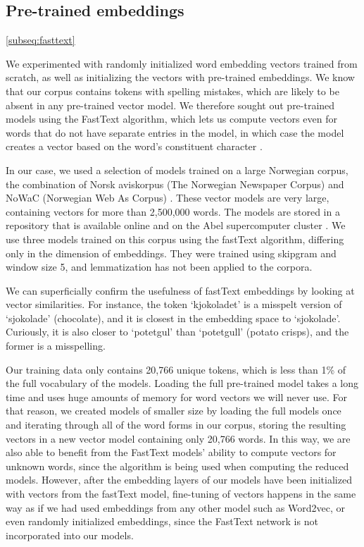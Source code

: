\subsection{Pre-trained embeddings}
\ref{subseq:fasttext}

We experimented with randomly initialized word embedding vectors trained from
scratch, as well as initializing the vectors with pre-trained embeddings. We
know that our corpus contains tokens with spelling mistakes, which are likely
to be absent in any pre-trained vector model. We therefore sought out
pre-trained models using the FastText algorithm, which lets us compute
vectors even for words that do not have separate entries in the model, in
which case the model creates a vector based on the word's constituent
character \ngrams.

In our case, we used a selection of models trained on a large Norwegian
corpus, the combination of Norsk aviskorpus (The Norwegian Newspaper Corpus)
and NoWaC (Norwegian Web As Corpus) \autocite{stadsnes2018}. These vector
models are very large, containing vectors for more than 2,500,000 words. The
models are stored in a repository that is available online and on the Abel
supercomputer cluster \autocite{murhaf2017repository}. We use three models
trained on this corpus using the fastText algorithm, differing only in the
dimension of embeddings. They were trained using skipgram and window size 5, 
and lemmatization has not been applied to the corpora.

We can superficially confirm the usefulness of fastText embeddings by looking
at vector similarities. For instance, the token `kjokoladet' is a misspelt
version of `sjokolade' (chocolate), and it is closest in the embedding space
to `sjokolade'. Curiously, it is also closer to `potetgul' than `potetgull'
(potato crisps), and the former is a misspelling.

Our training data only contains 20,766 unique tokens, which is less than 1\%
of the full vocabulary of the models. Loading the full pre-trained model
takes a long time and uses huge amounts of memory for word vectors we will
never use. For that reason, we created models of smaller size by loading the
full models once and iterating through all of the word forms in our corpus,
storing the resulting vectors in a new vector model containing only 20,766
words. In this way, we are also able to benefit from the FastText models'
ability to compute vectors for unknown words, since the \ngram algorithm is
being used when computing the reduced models. However, after the embedding
layers of our models have been initialized with vectors from the fastText
model, fine-tuning of vectors happens in the same way as if we had used
embeddings from any other model such as Word2vec, or even randomly
initialized embeddings, since the FastText network is not incorporated into
our models.

